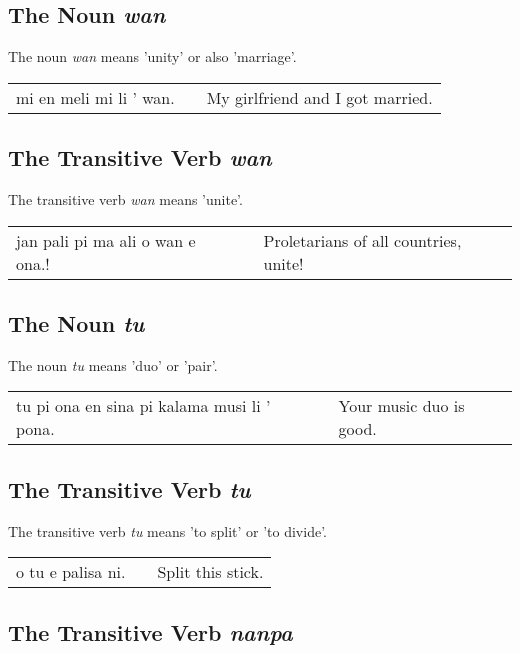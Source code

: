 \subsection*{The Noun \textit{wan}}
The noun \textit{wan} means 'unity' or also 'marriage'.

\begin{supertabular}{p{5,5cm}|ll}
    mi en meli mi li ' wan. &  & My girlfriend and I got married. \\
\end{supertabular}

\subsection*{The Transitive Verb \textit{wan}}
The transitive verb \textit{wan} means 'unite'.

\begin{supertabular}{p{5,5cm}|ll}
    jan pali pi ma ali o wan e ona.! &  & Proletarians of all countries, unite! \\
\end{supertabular}

\subsection*{The Noun \textit{tu}}
The noun \textit{tu} means 'duo' or 'pair'.

\begin{supertabular}{p{5,5cm}|ll}
    tu pi ona en sina pi kalama musi li ' pona. &  & Your music duo is good. \\
\end{supertabular}

\subsection*{The Transitive Verb \textit{tu}}
The transitive verb \textit{tu} means 'to split' or 'to divide'.

\begin{supertabular}{p{5,5cm}|ll}
    o tu e palisa ni. &  & Split this stick. \\
\end{supertabular}

\subsection*{The Transitive Verb \textit{nanpa}}

